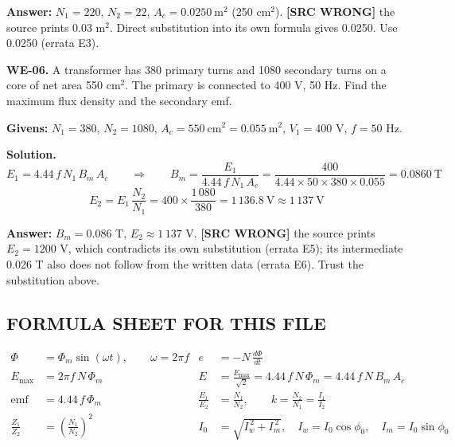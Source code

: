 \documentclass[11pt]{article}
\newcommand{\tagline}[1]{\textbf{\color{copper}#1}}
\newcommand{\srcwrong}[1]{\textbf{\color{red}[SRC WRONG]} #1}
\begin{document}
\textbf{Answer:} $N_1 = 220$, $N_2 = 22$, $A_c = 0.0250\ \text{m}^2$ (250 cm$^2$). \srcwrong{the source prints 0.03 m$^2$. Direct substitution into its own formula gives 0.0250. Use 0.0250 (errata E3).}

\vspace{2pt}

\tagline{WE-06.} A transformer has 380 primary turns and 1080 secondary turns on a core of net area 550 cm$^2$. The primary is connected to 400 V, 50 Hz. Find the maximum flux density and the secondary emf.

\textbf{Givens:} $N_1 = 380$, $N_2 = 1080$, $A_c = 550\ \text{cm}^2 = 0.055\ \text{m}^2$, $V_1 = 400$ V, $f = 50$ Hz.

\textbf{Solution.}
\[
E_1 = 4.44\,f\,N_1\,B_m\,A_c
\qquad\Longrightarrow\qquad
B_m = \frac{E_1}{4.44\,f\,N_1\,A_c} = \frac{400}{4.44 \times 50 \times 380 \times 0.055} = 0.0860\ \text{T}
\]
\[
E_2 = E_1\,\frac{N_2}{N_1} = 400 \times \frac{1\,080}{380} = 1\,136.8\ \text{V} \approx 1\,137\ \text{V}
\]

\textbf{Answer:} $B_m = 0.086$ T, $E_2 \approx 1\,137$ V. \srcwrong{the source prints $E_2 = 1200$ V, which contradicts its own substitution (errata E5); its intermediate 0.026 T also does not follow from the written data (errata E6). Trust the substitution above.}

\hrulefill
\subsection*{\color{copper}FORMULA SHEET FOR THIS FILE}
\begin{align*}
\Phi &= \Phi_m \sin(\omega t), \qquad \omega = 2\pi f &
e &= -N\,\frac{d\Phi}{dt} \\
E_{\text{max}} &= 2\pi f\,N\,\Phi_m &
E &= \frac{E_{\text{max}}}{\sqrt{2}} = 4.44\,f\,N\,\Phi_m = 4.44\,f\,N\,B_m\,A_c \\[4pt]
\text{emf per turn} &= 4.44\,f\,\Phi_m &
\frac{E_1}{E_2} &= \frac{N_1}{N_2}, \qquad k = \frac{N_2}{N_1} = \frac{I_1}{I_2} \\[4pt]
\frac{Z_1}{Z_2} &= \left(\frac{N_1}{N_2}\right)^{2} &
I_0 &= \sqrt{I_w^{\,2} + I_m^{\,2}}, \quad I_w = I_0\cos\phi_0, \quad I_m = I_0\sin\phi_0
\end{align*}
\end{document}

